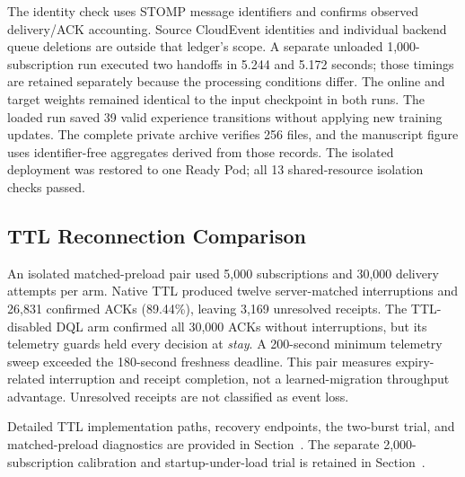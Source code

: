 The identity check uses STOMP message identifiers and confirms observed
delivery/ACK accounting. Source CloudEvent identities and individual backend
queue deletions are outside that ledger's scope. A separate unloaded
1,000-subscription run executed two handoffs in 5.244 and 5.172 seconds;
those timings are retained separately because the processing conditions
differ. The online and target weights remained identical to the input
checkpoint in both runs. The loaded run saved 39 valid experience transitions
without applying new training updates. The complete private archive verifies
256 files, and the manuscript figure uses identifier-free aggregates derived
from those records. The isolated deployment was restored to one Ready Pod;
all 13 shared-resource isolation checks passed.


\subsection{TTL Reconnection Comparison}
An isolated matched-preload pair used 5,000 subscriptions and 30,000 delivery
attempts per arm. Native TTL produced twelve server-matched interruptions and
26,831 confirmed ACKs (89.44\%), leaving 3,169 unresolved receipts. The
TTL-disabled DQL arm confirmed all 30,000 ACKs without interruptions, but its
telemetry guards held every decision at \emph{stay}. A 200-second minimum
telemetry sweep exceeded the 180-second freshness deadline. This pair measures
expiry-related interruption and receipt completion, not a learned-migration
throughput advantage. Unresolved receipts are not classified as event loss.

Detailed TTL implementation paths, recovery endpoints, the two-burst trial,
and matched-preload diagnostics are provided in
Section~.
The separate 2,000-subscription calibration and startup-under-load trial is
retained in Section~.
